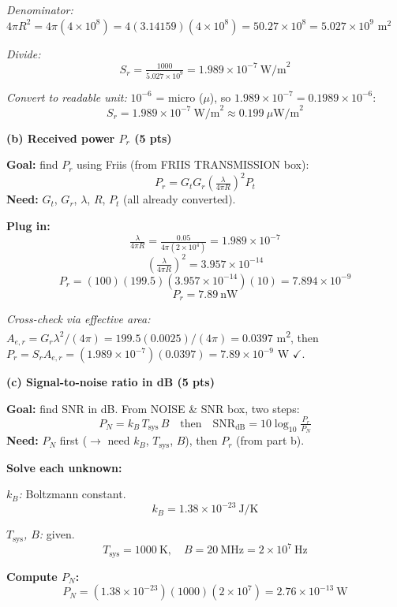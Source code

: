 \documentclass[11pt,letterpaper]{article}
\newcommand{\goal}[1]{\textbf{\color{purple}Goal:} #1}
\newcommand{\need}[1]{\textbf{\color{coral}Need:} #1}
\begin{document}
\textit{Denominator:}\ $4\pi R^2 = 4\pi(4{\times}10^8) = 4(3.14159)(4{\times}10^8) = 50.27{\times}10^8 = 5.027{\times}10^9$ m$^2$

\textit{Divide:}
\[S_r = \tfrac{1000}{5.027{\times}10^9} = 1.989{\times}10^{-7}~\text{W/m}^2\]

\textit{Convert to readable unit:} $10^{-6}$ = micro ($\mu$), so $1.989{\times}10^{-7} = 0.1989{\times}10^{-6}$:
\[\boxed{S_r = 1.989{\times}10^{-7}~\text{W/m}^2 \approx 0.199~\mu\text{W/m}^2}\]

\vspace{6pt}
\textbf{(b) Received power $P_r$ (5 pts)}

\begin{goalbox}
\goal{find $P_r$ using Friis (from FRIIS TRANSMISSION box):}
\[P_r = G_t G_r\!\left(\tfrac{\lambda}{4\pi R}\right)^{\!2}\!P_t\]
\need{$G_t$, $G_r$, $\lambda$, $R$, $P_t$ (all already converted).}
\end{goalbox}

\textbf{Plug in:}
\[\tfrac{\lambda}{4\pi R} = \tfrac{0.05}{4\pi(2\!\times\!10^4)} = 1.989\!\times\!10^{-7}\]
\[\left(\tfrac{\lambda}{4\pi R}\right)^{\!2} = 3.957\!\times\!10^{-14}\]
\[P_r = (100)(199.5)(3.957\!\times\!10^{-14})(10) = 7.894\!\times\!10^{-9}\]
\[\boxed{P_r = 7.89~\text{nW}}\]

\textit{Cross-check via effective area:} $A_{e,r} = G_r\lambda^2/(4\pi) = 199.5(0.0025)/(4\pi) = 0.0397$ m\textsuperscript{2}, then $P_r = S_r A_{e,r} = (1.989\!\times\!10^{-7})(0.0397) = 7.89\!\times\!10^{-9}$ W $\checkmark$.

\vspace{6pt}
\textbf{(c) Signal-to-noise ratio in dB (5 pts)}

\begin{goalbox}
\goal{find SNR in dB. From NOISE \& SNR box, two steps:}
\[P_N = k_B\,T_{\text{sys}}\,B\quad\text{then}\quad\text{SNR}_{\text{dB}} = 10\log_{10}\tfrac{P_r}{P_N}\]
\need{$P_N$ first ($\to$ need $k_B$, $T_{\text{sys}}$, $B$), then $P_r$ (from part b).}
\end{goalbox}

\textbf{Solve each unknown:}

\textit{$k_B$:} Boltzmann constant.
\[k_B = 1.38\!\times\!10^{-23}~\text{J/K}\]

\textit{$T_{\text{sys}}$, $B$:} given.
\[T_{\text{sys}} = 1000~\text{K},\quad B = 20~\text{MHz} = 2\!\times\!10^7~\text{Hz}\]

\textbf{Compute $P_N$:}
\[P_N = (1.38\!\times\!10^{-23})(1000)(2\!\times\!10^7) = 2.76\!\times\!10^{-13}~\text{W}\]
\end{document}
